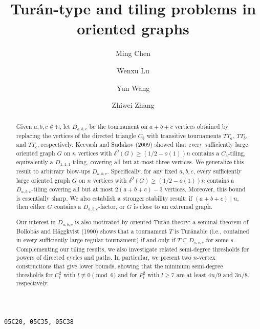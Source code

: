 \documentclass[11pt,a4paper,reqno]{amsart}
\title{Tur\'an-type and tiling problems in oriented graphs}
\author{Ming Chen}
\author{Wenxu Lu}
\author{Yun Wang}
\author{Zhiwei Zhang}
\theoremstyle{definition} %
\begin{document}
 

	\begin{abstract}

Given $a,b,c\in\mathbb N$, let $D_{a,b,c}$ be the tournament on $a+b+c$ vertices obtained by replacing the vertices of the directed triangle $C_3$ with transitive tournaments $TT_a$, $TT_b$, and $TT_c$, respectively. Keevash and Sudakov (2009) showed that every sufficiently large oriented graph $G$ on $n$ vertices with $\delta^{0}(G)\geqslant (1/2-o(1))n$ contains a $C_3$-tiling, equivalently a $D_{1,1,1}$-tiling, covering all but at most three vertices. We generalize this result to arbitrary blow-ups $D_{a,b,c}$. Specifically, for any fixed $a,b,c$, every sufficiently large oriented graph $G$ on $n$ vertices with $\delta^{0}(G)\geqslant (1/2-o(1))n$ contains a $D_{a,b,c}$-tiling covering all but at most $2(a+b+c)-3$ vertices. Moreover, this bound is essentially sharp. We also establish a stronger stability result: if $(a+b+c)\mid n$, then either $G$ contains a $D_{a,b,c}$-factor, or $G$ is close to an extremal graph.

 
Our interest in $D_{a,b,c}$ is also motivated by oriented Tur\'an theory: a seminal theorem of Bollob\'as and H\"aggkvist (1990) shows that a tournament $T$ is Tur\'anable (i.e., contained in every sufficiently large regular tournament) if and only if $T\subseteq D_{s,s,s}$ for some $s$.  Complementing our tiling results, we also investigate related semi-degree thresholds for powers of directed cycles and paths.  In particular, we present two $n$-vertex constructions that give lower bounds, showing that the minimum semi-degree thresholds for $C^2_l$ with $l\not\equiv 0\pmod 6$ and for $P^2_l$ with $l\geqslant 7$ are at least $4n/9$ and $3n/8$, respectively.
	\end{abstract}
	\maketitle
	   \texttt{05C20, 05C35, 05C38}


	
\end{document}
